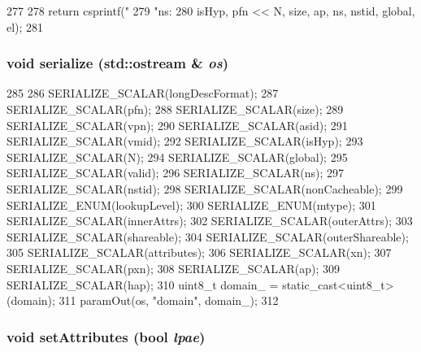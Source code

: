 \begin{DoxyCode}
277     {
278         return csprintf("%
279                         "ns:%
280                         isHyp, pfn << N, size, ap, ns, nstid, global, el);
281     }
\end{DoxyCode}
\hypertarget{structArmISA_1_1TlbEntry_a53e036786d17361be4c7320d39c99b84}{
\subsubsection[{serialize}]{\setlength{\rightskip}{0pt plus 5cm}void serialize (std::ostream \& {\em os})}}
\label{structArmISA_1_1TlbEntry_a53e036786d17361be4c7320d39c99b84}



\begin{DoxyCode}
285     {
286         SERIALIZE_SCALAR(longDescFormat);
287         SERIALIZE_SCALAR(pfn);
288         SERIALIZE_SCALAR(size);
289         SERIALIZE_SCALAR(vpn);
290         SERIALIZE_SCALAR(asid);
291         SERIALIZE_SCALAR(vmid);
292         SERIALIZE_SCALAR(isHyp);
293         SERIALIZE_SCALAR(N);
294         SERIALIZE_SCALAR(global);
295         SERIALIZE_SCALAR(valid);
296         SERIALIZE_SCALAR(ns);
297         SERIALIZE_SCALAR(nstid);
298         SERIALIZE_SCALAR(nonCacheable);
299         SERIALIZE_ENUM(lookupLevel);
300         SERIALIZE_ENUM(mtype);
301         SERIALIZE_SCALAR(innerAttrs);
302         SERIALIZE_SCALAR(outerAttrs);
303         SERIALIZE_SCALAR(shareable);
304         SERIALIZE_SCALAR(outerShareable);
305         SERIALIZE_SCALAR(attributes);
306         SERIALIZE_SCALAR(xn);
307         SERIALIZE_SCALAR(pxn);
308         SERIALIZE_SCALAR(ap);
309         SERIALIZE_SCALAR(hap);
310         uint8_t domain_ = static_cast<uint8_t>(domain);
311         paramOut(os, "domain", domain_);
312     }
\end{DoxyCode}
\hypertarget{structArmISA_1_1TlbEntry_ad4a13c759d4108dc9d0914a81b8d6703}{
\subsubsection[{setAttributes}]{\setlength{\rightskip}{0pt plus 5cm}void setAttributes (bool {\em lpae})}}
\label{structArmISA_1_1TlbEntry_ad4a13c759d4108dc9d0914a81b8d6703}



